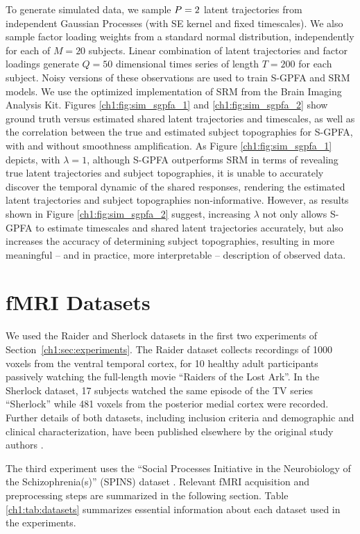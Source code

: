 To generate simulated data, we sample $P = 2$ latent trajectories from independent Gaussian Processes (with SE kernel and fixed timescales). We also sample factor loading weights from a standard normal distribution, independently for each of $M=20$ subjects. Linear combination of latent trajectories and factor loadings generate $Q = 50$ dimensional times series of length $T = 200$ for each subject. Noisy versions of these observations are used to train S-GPFA and SRM models. We use the optimized implementation of SRM \cite{srm_enabling} from the Brain Imaging Analysis Kit.
Figures \ref{ch1:fig:sim_sgpfa_1} and \ref{ch1:fig:sim_sgpfa_2} show ground truth versus estimated shared latent trajectories and timescales, as well as the correlation between the true and estimated subject topographies for S-GPFA, with and without smoothness amplification. As Figure \ref{ch1:fig:sim_sgpfa_1} depicts, with $\lambda=1$, although S-GPFA outperforms SRM in terms of revealing true latent trajectories and subject topographies, it is unable to accurately discover the temporal dynamic of the shared responses, rendering the estimated latent trajectories and subject topographies non-informative. However, as results shown in Figure \ref{ch1:fig:sim_sgpfa_2} suggest, increasing $\lambda$ not only allows S-GPFA to estimate timescales and shared latent trajectories accurately, but also increases the accuracy of determining subject topographies, resulting in more meaningful -- and in practice, more interpretable -- description of observed data.

\section{fMRI Datasets}

We used the Raider \cite{ha} and Sherlock \cite{sherlock} datasets in the first two experiments of Section~\ref{ch1:sec:experiments}. The Raider dataset collects recordings of 1000 voxels from the ventral temporal cortex, for 10 healthy adult participants passively watching the full-length movie ``Raiders of the Lost Ark''. In the Sherlock dataset, 17 subjects watched the same episode of the TV series ``Sherlock'' while 481 voxels from the posterior medial cortex were recorded. Further details of both datasets, including inclusion criteria and demographic and clinical characterization, have been published elsewhere by the original study authors \cite{ha, sherlock}.

The third experiment uses the ``Social Processes Initiative in the Neurobiology of the Schizophrenia(s)'' (SPINS) dataset \cite{spins}. Relevant fMRI acquisition and preprocessing steps are summarized in the following section. Table \ref{ch1:tab:datasets} summarizes essential information about each dataset used in the experiments.

